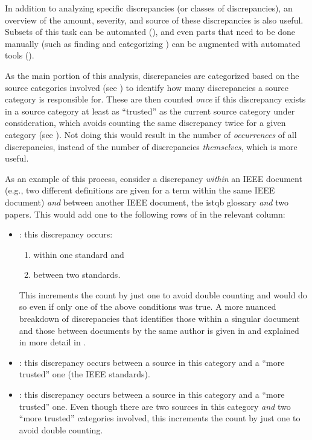 In addition to analyzing specific discrepancies (or classes of discrepancies),
an overview of the amount, severity, and source of these discrepancies is also
useful. Subsets of this task can be automated (),
and even parts that need to be done manually (such as finding and categorizing
) can be augmented with automated
tools ().

As the main portion of this analysis, discrepancies are categorized
based on the source categories involved (see ) to identify how
many discrepancies a source category is responsible for. These
are then counted \emph{once} if this discrepancy exists in a source category at
least as ``trusted'' as the current source category under consideration, which
avoids counting the same discrepancy twice for a given category (see
). Not doing this would result in the number of
\emph{occurrences} of all discrepancies, instead of the number of discrepancies
\emph{themselves}, which is more useful.

\label{discrep-analysis-example}
As an example of this process, consider a discrepancy \emph{within} an IEEE
document (e.g., two different definitions are given for a term within the same
IEEE document) \emph{and} between another IEEE document, the \acs{istqb}
glossary \emph{and} two papers. This would add one to the
following rows of  in the relevant column:

\begin{itemize}
    \item \textbf{}: this discrepancy occurs:
          \begin{enumerate}
              \item within one standard and
              \item between two standards.
          \end{enumerate}
          This increments the count by just one to avoid double counting and
          would do so even if only one of the above conditions was true. A more
          nuanced breakdown of discrepancies that identifies those within a
          singular document and those between documents by the same author is
          given in  and explained in more detail in
          .
    \item \textbf{}: this discrepancy occurs between a
          source in this category and a ``more trusted'' one
          (the IEEE standards).
    \item \textbf{}: this discrepancy occurs between a
          source in this category and a ``more trusted'' one. Even though there
          are two sources in this category \emph{and} two ``more trusted''
          categories involved, this increments the count by just one to avoid
          double counting.
\end{itemize}

